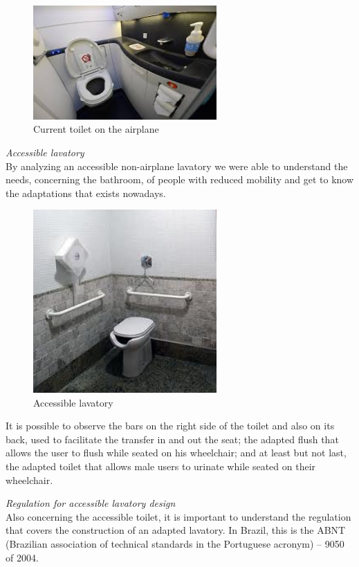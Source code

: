 \begin{figure}[h]
\centering
\includegraphics[width=7cm]{brazil_images/image012.jpg}
\caption{Current toilet on the airplane \cite{travel2012heard}}
\label{fig:current_toilet}
\end{figure}

\noindent\emph{Accessible lavatory}\\ By analyzing an accessible non-airplane lavatory we were able to understand the needs, concerning the bathroom, of people with reduced mobility and get to know the adaptations that exists nowadays.

\begin{figure}[h]
\centering
\includegraphics[width=7cm]{brazil_images/image013.jpg}
\caption{Accessible lavatory \cite{accessiblelav}}
\label{fig:accessible_lavatory}
\end{figure}


It is possible to observe the bars on the right side of the toilet and also on its back, used to facilitate the transfer in and out the seat; the adapted flush that allows the user to flush while seated on his wheelchair; and at least but not last, the adapted toilet that allows male users to urinate while seated on their wheelchair.

\noindent\emph{Regulation for accessible lavatory design}\\ Also concerning the accessible toilet, it is important to understand the regulation that covers the construction of an adapted lavatory. In Brazil, this is the ABNT (Brazilian association of technical standards in the Portuguese acronym) – 9050 of 2004.

